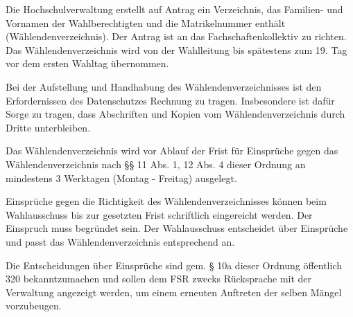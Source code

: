 \documentclass[%
draft,%
multilinesections%
]{fswo}
\begin{document}
\begin{contract}
Die Hochschulverwaltung erstellt auf Antrag ein Verzeichnis, das Familien- und Vornamen der Wahlberechtigten und die Matrikelnummer enthält (Wählendenverzeichnis).
Der Antrag ist an das Fachschaftenkollektiv zu richten.
Das Wählendenverzeichnis wird von der Wahlleitung bis spätestens zum 19. Tag vor dem ersten Wahltag übernommen.

Bei der Aufstellung und Handhabung des Wählendenverzeichnisses ist den Erfordernissen des Datenschutzes Rechnung zu tragen.
Insbesondere ist dafür Sorge zu tragen, dass Abschriften und Kopien vom Wählendenverzeichnis durch Dritte unterbleiben.

Das Wählendenverzeichnis wird vor Ablauf der Frist für Einsprüche gegen das Wählendenverzeichnis nach §§ 11 Abs. 1, 12 Abs. 4 dieser Ordnung an mindestens 3 Werktagen (Montag - Freitag) ausgelegt.

Einsprüche gegen die Richtigkeit des Wählendenverzeichnisses können beim Wahlausschuss bis zur gesetzten Frist schriftlich eingereicht werden.
Der Einspruch muss begründet sein.
Der Wahlausschuss entscheidet über Einsprüche und passt das Wählendenverzeichnis entsprechend an.

Die Entscheidungen über Einsprüche sind gem. § 10a dieser Ordnung öffentlich 320 bekanntzumachen und sollen dem FSR zwecks Rücksprache mit der Verwaltung angezeigt werden,
um einem erneuten Auftreten der selben Mängel vorzubeugen.
\end{contract}
\end{document}
